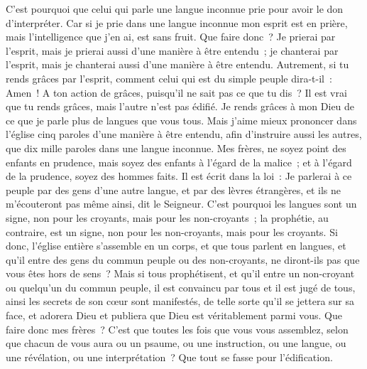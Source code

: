 \begin{multicols}{2}
C'est pourquoi que celui qui parle une langue inconnue prie pour avoir le don d'interpréter.
Car si je prie dans une langue inconnue mon esprit est en prière, mais l'intelligence que j'en ai, est sans fruit.
Que faire donc~? Je prierai par l'esprit, mais je prierai aussi d'une manière à être entendu~; je chanterai par l'esprit, mais je chanterai aussi d'une manière à être entendu.
Autrement, si tu rends grâces par l'esprit, comment celui qui est du simple peuple dira-t-il~: Amen~! A ton action de grâces, puisqu'il ne sait pas ce que tu dis~?
Il est vrai que tu rends grâces, mais l'autre n'est pas édifié.
Je rends grâces à mon Dieu de ce que je parle plus de langues que vous tous.
Mais j'aime mieux prononcer dans l'église cinq paroles d'une manière à être entendu, afin d'instruire aussi les autres, que dix mille paroles dans une langue inconnue.
Mes frères, ne soyez point des enfants en prudence, mais soyez des enfants à l'égard de la malice~; et à l'égard de la prudence, soyez des hommes faits.
Il est écrit dans la loi~: Je parlerai à ce peuple par des gens d'une autre langue, et par des lèvres étrangères, et ils ne m'écouteront pas même ainsi, dit le Seigneur.
C'est pourquoi les langues sont un signe, non pour les croyants, mais pour les non-croyants~; la prophétie, au contraire, est un signe, non pour les non-croyants, mais pour les croyants.
Si donc, l'église entière s'assemble en un corps, et que tous parlent en langues, et qu'il entre des gens du commun peuple ou des non-croyants, ne diront-ils pas que vous êtes hors de sens~?
Mais si tous prophétisent, et qu'il entre un non-croyant ou quelqu'un du commun peuple, il est convaincu par tous et il est jugé de tous,
ainsi les secrets de son cœur sont manifestés, de telle sorte qu'il se jettera sur sa face, et adorera Dieu et publiera que Dieu est véritablement parmi vous.
Que faire donc mes frères~? C'est que toutes les fois que vous vous assemblez, selon que chacun de vous aura ou un psaume, ou une instruction, ou une langue, ou une révélation, ou une interprétation~? Que tout se fasse pour l'édification.

\end{multicols}
